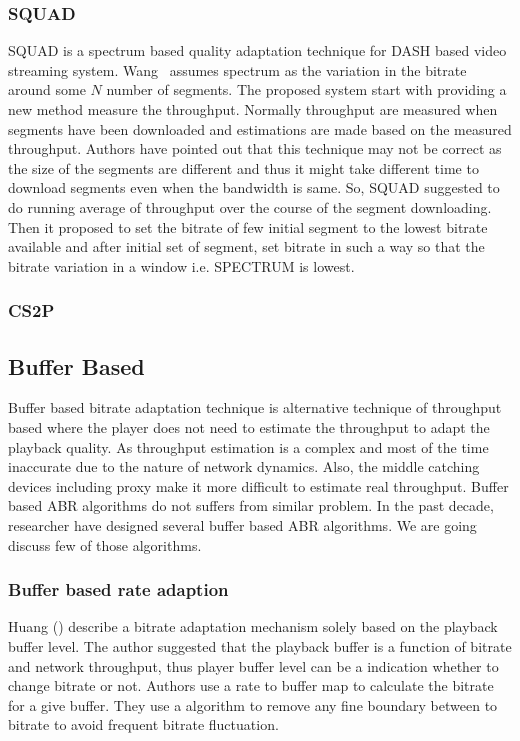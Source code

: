 \subsubsection{SQUAD\cite{10.1145/2910017.2910593}}
SQUAD\cite{10.1145/2910017.2910593} is a spectrum\cite{1386243} based quality adaptation technique for DASH based video streaming system. Wang \etal\ assumes spectrum as the variation in the bitrate around some $N$ number of segments. The proposed system start with providing a new method measure the throughput. Normally throughput are measured when segments have been downloaded and estimations are made based on the measured throughput. Authors have pointed out that this technique may not be correct as the size of the segments are different and thus it might take different time to download segments even when the bandwidth is same. So, SQUAD suggested to do running average of throughput over the course of the segment downloading. Then it proposed to set the bitrate of few initial segment to the lowest bitrate available and after initial set of segment, set bitrate in such a way so that the bitrate variation in a window i.e. SPECTRUM is lowest.

\subsubsection{CS2P\cite{10.1145/2934872.2934898}}



\subsection{Buffer Based}
Buffer based bitrate adaptation technique is alternative technique of throughput based where the player does not need to estimate the throughput to adapt the playback quality. As throughput estimation is a complex and most of the time inaccurate due to the nature of network dynamics. Also, the middle catching devices including proxy make it more difficult to estimate real throughput. Buffer based ABR algorithms do not suffers from similar problem. In the past decade, researcher have designed several buffer based ABR algorithms. We are going discuss few of those algorithms.

\subsubsection{Buffer based rate adaption\cite{10.1145/2619239.2626296,10.1145/2398776.2398800,10.1145/2491172.2491179}}
Huang \etal(\cite{10.1145/2619239.2626296,10.1145/2398776.2398800,10.1145/2491172.2491179}) describe a bitrate adaptation mechanism solely based on the playback buffer level. The author suggested that the playback buffer is a function of bitrate and network throughput, thus player buffer level can be a indication whether to change bitrate or not. Authors use a rate to buffer map to calculate the bitrate for a give buffer. They use a algorithm to remove any fine boundary between to bitrate to avoid frequent bitrate fluctuation.

